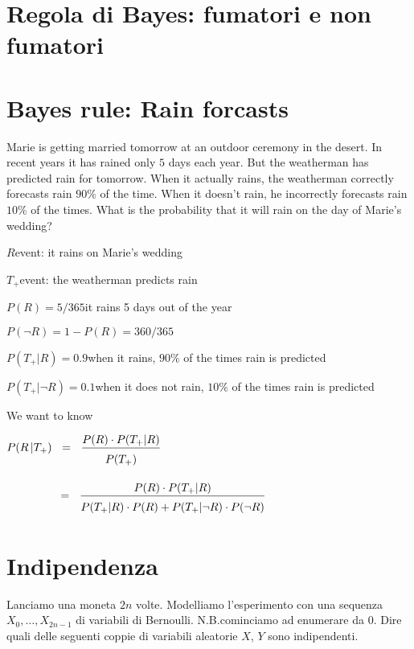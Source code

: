 \documentclass[10pt,openany]{book}
\theoremstyle{mio}
\theoremstyle{liscio}
\begin{document}
\clearpage\section{Regola di Bayes: fumatori e non fumatori}
\label{Fumatori_Bayes}



\clearpage\section{Bayes rule: Rain forcasts}
\label{rain_desert}

Marie is getting married tomorrow at an outdoor ceremony in the desert. In recent years it has rained only $5$ days each year. But the weatherman has predicted rain for tomorrow. When it actually rains, the weatherman correctly forecasts rain $90\%$ of the time. When it doesn’t rain, he incorrectly forecasts rain $10\%$ of the times. What is the probability that it will rain on the day of Marie’s wedding?


$R$\hfill event: it rains on Marie’s wedding

$T_+$\hfill event: the weatherman predicts rain

$P (R) = 5/365$\hfill it rains 5 days out of the year

$P (\neg R) = 1-P(R)= 360/365$

$P (T_+|R) = 0.9$\hfill when it rains, $90\%$ of the times rain is predicted

$P (T_+|\neg R) = 0.1$\hfill when it does not rain, $10\%$ of the times rain is predicted

\bigskip
We want to know

$\displaystyle P(R\,| T_+)\medrel{=}\frac{P(R)\cdot P(T_+|R)}{P(T_+)\vphantom{\Big[}}$

$\displaystyle\hphantom{P(R | T_+)}\medrel{=}\frac{P(R)\cdot P(T_+|R)}{P(T_+|R)\cdot P(R)+ P(T_+|\neg R)\cdot P(\neg R)\vphantom{\Big[}}$


\clearpage\section{Indipendenza}
\label{esercizio_indipendenza}

Lanciamo una moneta $2n$ volte. Modelliamo l'esperimento con una sequenza $X_0,\dots,X_{2n-1}$ di variabili di Bernoulli. N.B.\@ cominciamo ad enumerare da $0$. Dire quali delle seguenti coppie di variabili aleatorie $X$, $Y$ sono indipendenti.\medskip
\end{document}
